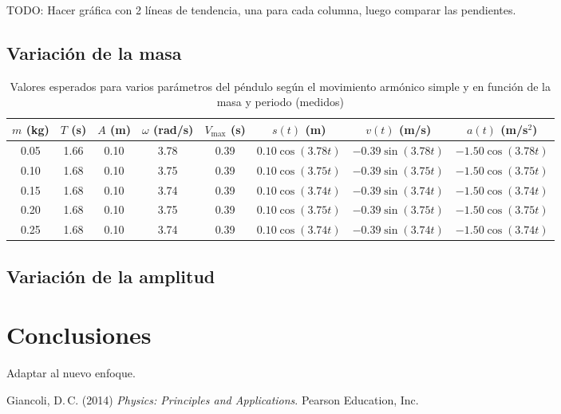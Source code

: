 \documentclass[letterpaper]{report}
\numberwithin{table}{section}
\begin{document}
{\color{red} TODO: Hacer gráfica con 2 líneas de tendencia, una para
cada columna, luego comparar las pendientes.}

\subsection{Variación de la masa}

\begin{table}[h]
  \centering
  \footnotesize
  \begin{tabular}{cccccccc}
    \toprule
    $m$ (kg) & $T$ (s) & $A$ (m) & $\omega$ (rad/s) & $V_{\max}$ (s) &
    $s(t)$ (m) & $v(t)$ (m/s) & $a(t)$ (m/s$^{2}$)\\
    \midrule
    0.05 & 1.66 & 0.10 & 3.78 & 0.39 & $0.10 \cos(3.78t)$ & $-0.39
    \sin(3.78t)$ & $-1.50\cos(3.78t)$ \\
    0.10 & 1.68 & 0.10 & 3.75 & 0.39 & $0.10 \cos(3.75t)$ & $-0.39
    \sin(3.75t)$ & $-1.50\cos(3.75t)$ \\
    0.15 & 1.68 & 0.10 & 3.74 & 0.39 & $0.10 \cos(3.74t)$ & $-0.39
    \sin(3.74t)$ & $-1.50\cos(3.74t)$ \\
    0.20 & 1.68 & 0.10 & 3.75 & 0.39 & $0.10 \cos(3.75t)$ & $-0.39
    \sin(3.75t)$ & $-1.50\cos(3.75t)$ \\
    0.25 & 1.68 & 0.10 & 3.74 & 0.39 & $0.10 \cos(3.74t)$ & $-0.39
    \sin(3.74t)$ & $-1.50\cos(3.74t)$ \\
    \bottomrule
  \end{tabular}
  \caption{Valores esperados para varios parámetros del péndulo según el
    movimiento armónico simple y en función de la masa y periodo
  (medidos)}\label{tab:masa_valores_esperados}
\end{table}

\subsection{Variación de la amplitud}


\section{Conclusiones}

{\color{red} Adaptar al nuevo enfoque.}

\renewcommand{\refname}{Bibliografía}
\begin{thebibliography}{1}
  \bibitem{}
  Giancoli, D.\,C. (2014) \textit{Physics: Principles and
  Applications}. Pearson Education, Inc.
\end{thebibliography}
\end{document}
